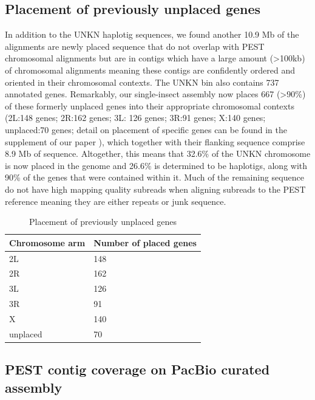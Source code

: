 \subsection{Placement of previously unplaced genes}\label{section:unkn}
\par{
In addition to the UNKN haplotig sequences, we found another 10.9 Mb of the alignments are newly placed sequence that do not overlap with PEST chromosomal alignments but are in contigs which have a large amount (>100kb) of chromosomal alignments meaning these contigs are confidently ordered and oriented in their chromosomal contexts. The UNKN bin also contains 737 annotated genes. Remarkably, our single-insect assembly now places 667 (>90\%) of these formerly unplaced genes into their appropriate chromosomal contexts (2L:148 genes; 2R:162 genes; 3L: 126 genes; 3R:91 genes; X:140 genes; unplaced:70 genes; detail on placement of specific genes can be found in the supplement of our paper \cite{singlemosquito}), which together with their flanking sequence comprise 8.9 Mb of sequence. Altogether, this means that 32.6\% of the UNKN chromosome is now placed in the genome and 26.6\% is determined to be haplotigs, along with 90\% of the genes that were contained within it. Much of the remaining sequence do not have high mapping quality subreads when aligning subreads to the PEST reference meaning they are either repeats or junk sequence.
}

\begin{table}[htbp!]
\caption{Placement of previously unplaced genes}
\label{table:unplaced}
\begin{tabular}{ | l | l |}
\hline
 Chromosome arm & Number of placed genes  \\
 
 \hline
 2L & 148 \\
 \hline
 2R & 162 \\
 \hline
 3L & 126 \\
 \hline
 3R & 91 \\
 \hline
 X & 140 \\
 \hline
 unplaced & 70 \\
 \hline
\end{tabular} 
\end{table}

\subsection{PEST contig coverage on PacBio curated assembly}

